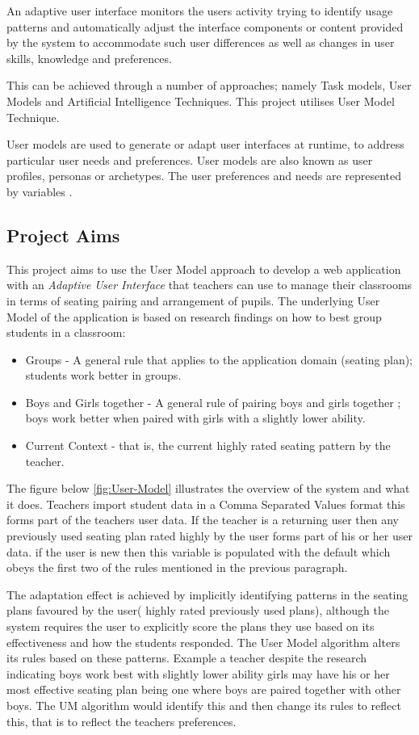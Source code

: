 An adaptive user interface monitors the users activity trying to identify usage patterns and automatically adjust the interface components or content provided by the system to accommodate such user differences as well as changes in user skills, knowledge and preferences.\cite{alvarez2007current}

This can be achieved through a number of approaches; namely Task models, User Models and Artificial Intelligence Techniques. This project utilises User Model Technique. 

User models are used to generate or adapt user interfaces at runtime, to address particular user needs and preferences. User models are also known as user profiles, personas or archetypes. The user preferences and needs are represented by variables \cite{W3C}.
\subsection{Project Aims}
This project aims to use the User Model approach to develop a web application with an \emph{Adaptive User Interface} that teachers can use to manage their classrooms in terms of seating pairing and arrangement of pupils. The underlying User Model of the application is based on research findings on how to best group students in a classroom:

\begin{itemize}
    \item Groups - A general rule that applies to the application domain (seating plan); students work better in groups.
    \item Boys and Girls together - A general rule of pairing boys and girls together ; boys work better when paired with girls with a slightly lower ability. \cite{OFSTED}
    \item Current Context - that is, the current highly rated seating pattern by the teacher. 
\end{itemize}

The figure below \ref{fig:User-Model} illustrates the overview of the system and what it does. Teachers import student data in a Comma Separated Values format this forms part of the teachers user data. If the teacher is a returning user then any previously used seating plan rated highly by the user forms part of his or her user data. if the user is new then this variable is populated with the default which obeys the first two of the rules mentioned in the previous paragraph.

The adaptation effect is achieved by implicitly identifying patterns in the seating plans favoured by the user( highly rated previously used plans), although the system requires the user to explicitly score the plans they use based on its effectiveness and how the students responded. The User Model algorithm alters its rules based on these patterns. Example a teacher despite the research indicating boys work best with slightly lower ability girls may have his or her most effective seating plan being one where boys are paired together with other boys. The UM algorithm would identify this and then change its rules to reflect this, that is to reflect the teachers preferences.

